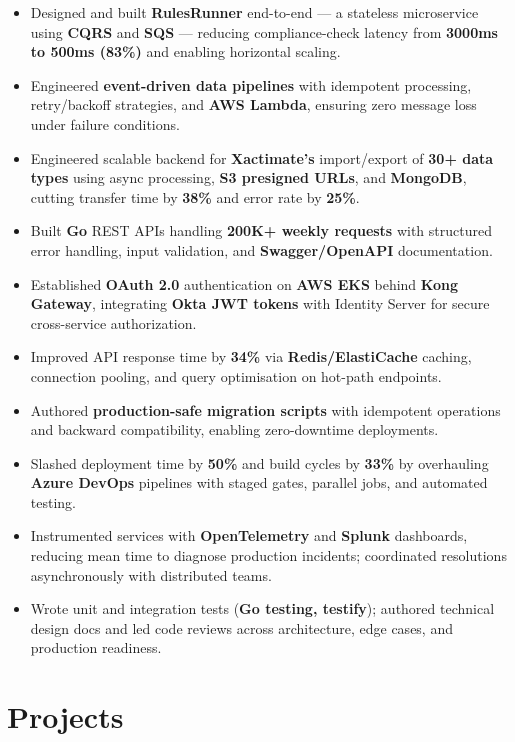 \documentclass[a4paper,10pt]{article}
\begin{document}
\begin{itemize}[leftmargin=*]
    \item Designed and built \textbf{RulesRunner} end-to-end --- a stateless microservice using \textbf{CQRS} and \textbf{SQS} --- reducing compliance-check latency from \textbf{3000ms to 500ms (83\%)} and enabling horizontal scaling.
    \item Engineered \textbf{event-driven data pipelines} with idempotent processing, retry/backoff strategies, and \textbf{AWS Lambda}, ensuring zero message loss under failure conditions.
    \item Engineered scalable backend for \textbf{Xactimate's} import/export of \textbf{30+ data types} using async processing, \textbf{S3 presigned URLs}, and \textbf{MongoDB}, cutting transfer time by \textbf{38\%} and error rate by \textbf{25\%}.
    \item Built \textbf{Go} REST APIs handling \textbf{200K+ weekly requests} with structured error handling, input validation, and \textbf{Swagger/OpenAPI} documentation.
    \item Established \textbf{OAuth 2.0} authentication on \textbf{AWS EKS} behind \textbf{Kong Gateway}, integrating \textbf{Okta JWT tokens} with Identity Server for secure cross-service authorization.
    \item Improved API response time by \textbf{34\%} via \textbf{Redis/ElastiCache} caching, connection pooling, and query optimisation on hot-path endpoints.
    \item Authored \textbf{production-safe migration scripts} with idempotent operations and backward compatibility, enabling zero-downtime deployments.
    \item Slashed deployment time by \textbf{50\%} and build cycles by \textbf{33\%} by overhauling \textbf{Azure DevOps} pipelines with staged gates, parallel jobs, and automated testing.
    \item Instrumented services with \textbf{OpenTelemetry} and \textbf{Splunk} dashboards, reducing mean time to diagnose production incidents; coordinated resolutions asynchronously with distributed teams.
    \item Wrote unit and integration tests (\textbf{Go testing, testify}); authored technical design docs and led code reviews across architecture, edge cases, and production readiness.
\end{itemize}

\section*{Projects}
\end{document}
